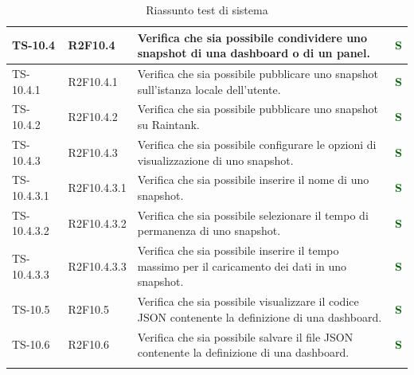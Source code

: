 \begin{longtable}{|C{2.5cm}|C{2.5cm}|C{6.5cm}|C{1.5cm}|}
			\hline
			{TS-10.4} & {R2F10.4} & Verifica che sia possibile condividere uno
			snapshot di una dashboard o di un
			panel.  & \textcolor{darkgreen}{\textbf{S}}\\
			\hline
			{TS-10.4.1} & {R2F10.4.1} & Verifica che sia possibile pubblicare uno
			snapshot sull'istanza locale dell'utente.   & \textcolor{darkgreen}{\textbf{S}}\\
			\hline
			{TS-10.4.2} & {R2F10.4.2} & Verifica che sia possibile pubblicare uno
			snapshot su Raintank.  & \textcolor{darkgreen}{\textbf{S}}\\
			\hline
			{TS-10.4.3} & {R2F10.4.3} & Verifica che sia possibile configurare le
			opzioni di visualizzazione di uno
			snapshot.
  & \textcolor{darkgreen}{\textbf{S}}\\
			\hline
			{TS-10.4.3.1} & {R2F10.4.3.1} & Verifica che sia possibile inserire il nome
			di uno snapshot.  & \textcolor{darkgreen}{\textbf{S}}\\
			\hline
			{TS-10.4.3.2} & {R2F10.4.3.2} & Verifica che sia possibile selezionare il
			tempo di permanenza di uno snapshot.  & \textcolor{darkgreen}{\textbf{S}}\\
			\hline
			{TS-10.4.3.3} & {R2F10.4.3.3} & Verifica che sia possibile inserire il tempo
			massimo per il caricamento dei dati in
			uno snapshot.
  & \textcolor{darkgreen}{\textbf{S}}\\
			\hline
			{TS-10.5} & {R2F10.5} & Verifica che sia possibile visualizzare il
			codice JSON contenente la definizione
			di una dashboard.  & \textcolor{darkgreen}{\textbf{S}}\\
			\hline
			{TS-10.6} & {R2F10.6} & Verifica che sia possibile salvare il file
			JSON contenente la definizione di una
			dashboard.  & \textcolor{darkgreen}{\textbf{S}}\\
			\hline
	\caption{Riassunto test di sistema}
	\label{tabella:riassunto TS}
\end{longtable}
\renewcommand{\arraystretch}{1}
